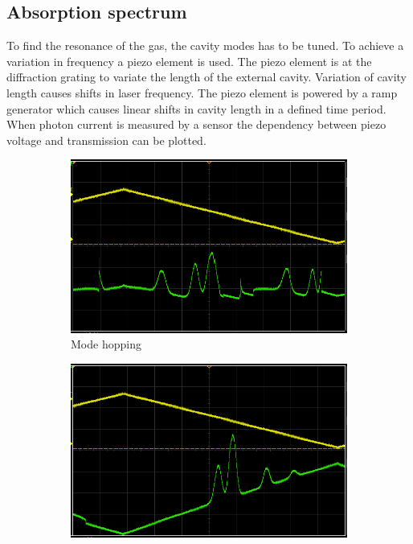 \subsection{Absorption spectrum}%
\label{sub:absorbtion_spectrum}
To find the resonance of the gas, the cavity modes has to be tuned.
To achieve a variation in frequency a piezo element is used.
The piezo element is at the diffraction grating to variate the length of the
external cavity.
Variation of cavity length causes shifts in laser frequency.
The piezo element is powered by a ramp generator which causes linear shifts in
cavity length in a defined time period.
When photon current is measured by a sensor the dependency between piezo voltage and
transmission can be plotted.
\begin{figure}[ht]
		\centering
		\begin{subfigure}[b]{0.49\textwidth}
				\begin{center}
				\includegraphics[width=1.0\linewidth]{./content/pictures/scope_136.png}
						\caption{Mode hopping}%
				\label{fig:piezotest}
				\end{center}
		\end{subfigure}
		\begin{subfigure}[b]{0.49\textwidth}
				\begin{center}
						\includegraphics[width=1.0\linewidth]{./content/pictures/scope_138.png}

\end{center}
\end{subfigure}
\end{figure}
